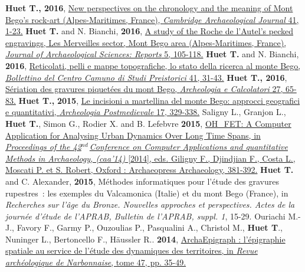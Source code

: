 \documentclass[11pt]{report} %
\begin{document}
\smallbreak
\textbf{Huet T., 2016}, \href{https://www.cambridge.org/core/journals/cambridge-archaeological-journal/article/new-perspectives-on-the-chronology-and-meaning-of-mont-bego-rock-art-alpesmaritimes-france/C5FB5BC57930F79DA17CB6F2CDE60C82}{New perspectives on the chronology and the meaning of Mont Bego's rock-art (Alpes-Maritimes, France), \textit{Cambridge Archaeological Journal} 41, 1-23.}
\smallbreak
\textbf{Huet T.} and N. Bianchi, \textbf{2016}, \href{https://www.sciencedirect.com/science/article/abs/pii/S2352409X15301760}{A study of the Roche de l'Autel's pecked engravings, Les Merveilles sector, Mont Bego area (Alpes-Maritimes, France), \textit{Journal of Archaeological Sciences: Reports} 5, 105-118.}
\smallbreak
\textbf{Huet T.} and N. Bianchi, \textbf{2016}, \href{http://www.ccsp.it/web/infoccsp/bcsp/bcsp41_preview.pdf}{Reticolati, pelli e mappe topografiche, lo stato della ricerca al monte Bego, \textit{Bollettino del Centro Camuno di Studi Preistorici} 41, 31-43.}
\smallbreak
\textbf{Huet T., 2016}, \href{https://dialnet.unirioja.es/servlet/articulo?codigo=6028872}{S\'{e}riation des gravures piquet\'{e}es du mont Bego, \textit{Archeologia e Calcolatori} 27, 65-83.}
\smallbreak
\textbf{Huet T.,} \textbf{2015}, \href{https://www.insegnadelgiglio.it/wp-content/uploads/2015/01/APM_17_libro-anteprima.pdf}{Le incisioni a martellina del monte Bego: approcci geografici e quantitativi, \textit{Archeologia Postmedievale} 17, 329-338.}
\smallbreak
Saligny L., Granjon L., \textbf{Huet T.}, Simon G., Rodier X. and B. Lefebvre \textbf{2015}, \href{https://hal.archives-ouvertes.fr/halshs-01146871}{OH\_FET: A Computer Application for Analysing Urban Dynamics Over Long Time Spans, in\textit{ Proceedings of the 42${}^{nd\ }$Conference on Computer Applications and quantitative Methods in Archaeology, (caa'14) }[2014], eds\textit{. }Giligny F., Djindjian F., Costa L., Moscati P. et S. Robert, Oxford : Archaeopress Archaeology, 381-392.}
\smallbreak
\textbf{Huet T.} and C. Alexander, \textbf{2015}, M\'{e}thodes informatiques pour l'\'{e}tude des gravures rupestres~: les exemples du Valcamonica (Italie) et du mont Bego (France), in \textit{Recherches sur l'\^{a}ge du Bronze. Nouvelles approches et perspectives. Actes de la journ\'{e}e d'\'{e}tude de l'APRAB, Bulletin de l'APRAB, suppl. 1}, 15-29.
\smallbreak
Ouriachi M.-J., Favory F., Garmy P., Ouzoulias P., Pasqualini A., Christol M., \textbf{Huet T}., Nuninger L., Bertoncello F., H\"{a}ussler R.. \textbf{2014}, \href{https://www.persee.fr/doc/ran_0557-7705_2014_num_47_1_1897}{ArchaEpigraph : l'\'{e}pigraphie spatiale au service de l'\'{e}tude des dynamiques des territoires, in \textit{Revue arch\'{e}ologique de Narbonnaise}, tome 47, pp. 35-49.}
\end{document}
